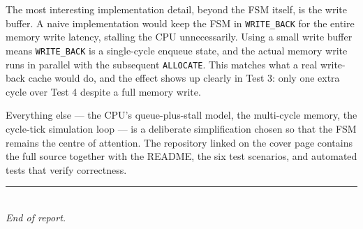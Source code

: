 \documentclass[11pt,a4paper]{article}
\begin{document}
The most interesting implementation detail, beyond the FSM itself, is the
write buffer. A naive implementation would keep the FSM in \texttt{WRITE\_BACK}
for the entire memory write latency, stalling the CPU unnecessarily. Using a
small write buffer means \texttt{WRITE\_BACK} is a single-cycle enqueue state,
and the actual memory write runs in parallel with the subsequent
\texttt{ALLOCATE}. This matches what a real write-back cache would do, and
the effect shows up clearly in Test 3: only one extra cycle over Test 4
despite a full memory write.

Everything else — the CPU's queue-plus-stall model, the multi-cycle memory,
the cycle-tick simulation loop — is a deliberate simplification chosen so
that the FSM remains the centre of attention. The repository linked on the
cover page contains the full source together with the README, the six test
scenarios, and automated tests that verify correctness.

\begin{center}
\rule{6cm}{0.4pt}\\[0.3em]
\textit{End of report.}
\end{center}
\end{document}
